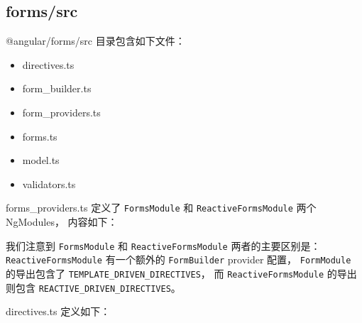 \subsection{forms/src}


@angular/forms/src 目录包含如下文件：

\begin{itemize}
  \item directives.ts
  \item form\_builder.ts
  \item form\_providers.ts
  \item forms.ts
  \item model.ts
  \item validators.ts
\end{itemize}


forms\_providers.ts 定义了 \texttt{FormsModule} 和 \texttt{ReactiveFormsModule} 两个 NgModules，
内容如下：




我们注意到 \texttt{FormsModule} 和 \texttt{ReactiveFormsModule} 两者的主要区别是：
\texttt{ReactiveFormsModule} 有一个额外的 \texttt{FormBuilder} provider 配置，
\texttt{FormModule} 的导出包含了 \texttt{TEMPLATE\_DRIVEN\_DIRECTIVES}，
而 \texttt{ReactiveFormsModule} 的导出则包含 \texttt{REACTIVE\_DRIVEN\_DIRECTIVES}。


directives.ts 定义如下：




